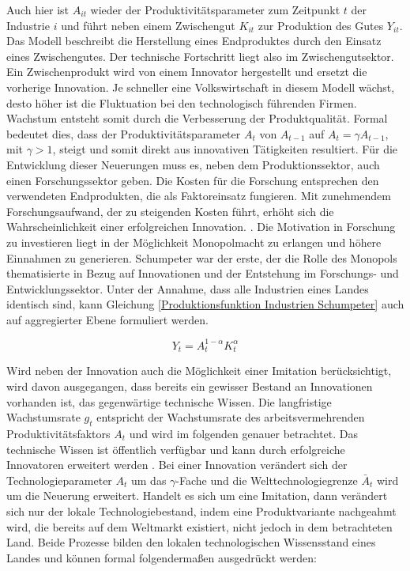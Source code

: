 Auch hier ist $A_{it}$ wieder der Produktivit{\"a}tsparameter zum Zeitpunkt $t$ der Industrie $i$ und f{\"u}hrt neben einem Zwischengut $K_{it}$ zur Produktion des Gutes $Y_{it}$. Das Modell beschreibt die Herstellung eines Endproduktes durch den Einsatz eines Zwischengutes. Der technische Fortschritt liegt also im Zwischengutsektor.  Ein Zwischenprodukt wird von einem Innovator hergestellt und ersetzt die vorherige Innovation. Je schneller eine Volkswirtschaft in diesem Modell w{\"a}chst, desto h{\"o}her ist die Fluktuation bei den technologisch f{\"u}hrenden Firmen. \newline Wachstum entsteht somit durch die Verbesserung der Produktqualit{\"a}t. Formal bedeutet dies, dass der Produktivit{\"a}tsparameter $A_t$ von $A_{t-1}$ auf $A_t=\gamma A_{t-1}$, mit $\gamma>1$, steigt und somit direkt aus innovativen T{\"a}tigkeiten resultiert. F{\"u}r die Entwicklung dieser Neuerungen muss es, neben dem Produktionssektor, auch einen Forschungssektor geben. Die Kosten f{\"u}r die Forschung entsprechen den verwendeten Endprodukten, die als  Faktoreinsatz fungieren. Mit zunehmendem Forschungsaufwand, der zu steigenden Kosten führt, erhöht sich die Wahrscheinlichkeit einer erfolgreichen Innovation. 
. \newline Die Motivation in Forschung zu investieren liegt in der M{\"o}glichkeit Monopolmacht zu erlangen und h{\"o}here Einnahmen zu generieren. Schumpeter war der erste, der die Rolle des Monopols thematisierte in Bezug auf Innovationen und der Entstehung im Forschungs- und Entwicklungssektor. \newline Unter der Annahme, dass alle Industrien eines Landes identisch sind, kann Gleichung \eqref{Produktionsfunktion Industrien Schumpeter} auch auf aggregierter Ebene formuliert werden.

	\begin{equation}
		Y_t=A_t^{1-\alpha}K_t^\alpha
	\end{equation}

Wird neben der Innovation auch die Möglichkeit einer Imitation berücksichtigt, wird davon ausgegangen, dass bereits ein gewisser Bestand an Innovationen vorhanden ist, das gegenwärtige technische Wissen. Die langfristige Wachstumsrate $g_t$ entspricht der Wachstumsrate des arbeitsvermehrenden Produktivit{\"a}tsfaktors $A_t$ und wird im folgenden genauer betrachtet. Das technische Wissen ist {\"o}ffentlich verf{\"u}gbar und kann durch erfolgreiche Innovatoren erweitert werden \citep{Aghion.1992,Aghion.1998}.  Bei einer Innovation ver{\"a}ndert sich der Technologieparameter $A_t$ um das $\gamma$-Fache und die Welttechnologiegrenze $\bar{A}_t$ wird um die Neuerung erweitert. Handelt es sich um eine Imitation, dann ver{\"a}ndert sich nur der lokale Technologiebestand, indem eine Produktvariante nachgeahmt wird, die bereits auf dem Weltmarkt existiert, nicht jedoch in dem betrachteten Land. Beide Prozesse bilden den lokalen technologischen Wissensstand eines Landes und k{\"o}nnen formal folgenderma{\ss}en ausgedr{\"u}ckt werden: 

